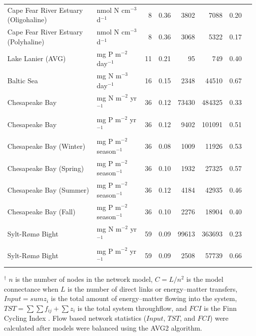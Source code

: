 \documentclass[article]{jss}
\begin{document}
\begin{table}[ht]
\begin{center}
\begin{tiny}
\begin{tabular}{llrrrrrr}
      Cape Fear River Estuary (Oligohaline) & nmol N cm$^{-3}$ d$^{-1}$ &   8 & 0.36 & 3802 & 7088 & 0.20 & \citet{hines12} \\
      Cape Fear River Estuary (Polyhaline) & nmol N cm$^{-3}$ d$^{-1}$ &   8 & 0.36 & 3068 & 5322 & 0.17 & \citet{hines15} \\
      Lake Lanier (AVG) & mg P m$^{-2}$ day$^{-1}$ &  11 & 0.21 &  95 & 749 & 0.40 & \citet{borrett07_lanier} \\
      Baltic Sea & mg N m$^{-3}$ day$^{-1}$  &  16 & 0.15 & 2348 & 44510 & 0.67 & \citet{hinrichsen98_baltic} \\
      Chesapeake Bay & mg N m$^{-2}$ yr$^{-1}$  &  36 & 0.12 & 73430 & 484325 & 0.33 & \citet{baird95} \\
      Chesapeake Bay & mg P m$^{-2}$ yr$^{-1}$ &  36 & 0.12 & 9402 & 101091 & 0.51 & \citet{ulanowicz99} \\
      Chesapeake Bay (Winter) & mg P m$^{-2}$ season$^{-1}$ &  36 & 0.08 & 1009 & 11926 & 0.53 & \citet{ulanowicz99} \\
      Chesapeake Bay (Spring) & mg P m$^{-2}$ season$^{-1}$ &  36 & 0.10 & 1932 & 27325 & 0.57 & \citet{ulanowicz99} \\
      Chesapeake Bay (Summer) & mg P m$^{-2}$ season$^{-1}$ &  36 & 0.12 & 4184 & 42935 & 0.46 & \citet{ulanowicz99} \\
      Chesapeake Bay (Fall) & mg P m$^{-2}$ season$^{-1}$ &  36 & 0.10 & 2276 & 18904 & 0.40 & \citet{ulanowicz99} \\
      Sylt-R{\o}m{\o} Bight & mg N m$^{-2}$ yr$^{-1}$  &  59 & 0.09 & 99613 & 363693 & 0.23 & \citet{baird08_sylt} \\
      Sylt-R{\o}m{\o} Bight & mg P m$^{-2}$ yr$^{-1}$  &  59 & 0.09 & 2508 & 57739 & 0.66 & \citet{baird08_sylt} \\
      \hline
    \end{tabular}
  \end{tiny}
\end{center}
\begin{scriptsize}
  $^\dagger$ $n$ is the number of nodes in the network model,
  $C=L/n^2$ is the model connectance when $L$ is the number of direct
  links or energy--matter transfers, $Input =sum{z_i}$ is the total
  amount of energy--matter flowing into the system,
  $TST=\sum\sum{f_{ij}}+\sum{z_i}$ is the total system throughflow,
  and $FCI$ is the Finn Cycling Index \citep{finn80}. Flow based
  network statistics ($Input$, $TST$, and $FCI$) were calculated after
  models were balanced using the AVG2 algorithm.
\end{scriptsize}
\end{table}
\end{document}
